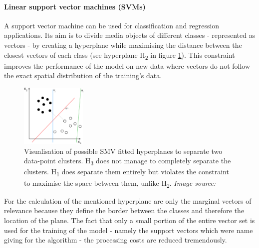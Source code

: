 \paragraph{Linear support vector machines (SVMs)}
A support vector machine can be used for classification and regression applications. Its aim is to divide media objects of different classes - represented as vectors - by creating a hyperplane while maximising the distance between the closest vectors of each class (see hyperplane H\textsubscript{2} in figure \ref{fig:SVM_visualisation}). This constraint improves the performance of the model on new data where vectors do not follow the exact spatial distribution of the training's data.

\begin{figure} %
    \centerline{\includegraphics[trim={0 0 0 0},clip,width=0.28\textwidth]{img/Svm_separating_hyperplanes}}
  \caption{Visualisation of possible SMV fitted hyperplanes to separate two data-point clusters. H\textsubscript{3} does not manage to completely separate the clusters. H\textsubscript{1} does separate them entirely but violates the constraint to maximise the space between them, unlike H\textsubscript{2}. \textit{Image source:} \parencite{Wikipedia}}
  \label{fig:SVM_visualisation}
\vspace{-0.5cm}
\end{figure}

For the calculation of the mentioned hyperplane are only the marginal vectors of relevance because they define the border between the classes and therefore the location of the plane. The fact that only a small portion of the entire vector set is used for the training of the model - namely the support vectors which were name giving for the algorithm - the processing costs are reduced tremendously.


